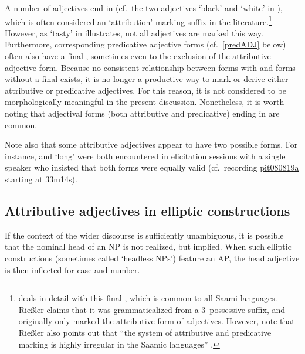A number of adjectives end in  (cf.~the two adjectives  ‘black’ and  ‘white’ in ), which is often considered an ‘attribution’ marking suffix in the literature.\footnote{\citet[215-228]{Riessler2011} deals in detail with this final , which is common to all Saami languages. Rießler claims that it was grammaticalized from a 3\SGs\ possessive suffix, and originally only marked the attributive form of adjectives. However, note that Rießler also points out that “the system of attributive and predicative marking is highly irregular in the Saamic languages” \citep[215]{Riessler2011}.} 
However, as  ‘tasty’ in  illustrates, not all adjectives are marked this way. Furthermore, corresponding predicative adjective forms (cf.~\SEC\ref{predADJ} below) often also have a final , sometimes even to the exclusion of the attributive adjective form. Because no consistent relationship between forms with and forms without a final  exists, it is no longer a productive way to mark or derive either attributive or predicative adjectives. For this reason, it is not considered to be morphologically meaningful in the present discussion. Nonetheless, it is worth noting that adjectival forms (both attributive and predicative) ending in  are common. 

Note also that some attributive adjectives appear to have two possible forms. For instance,  and  ‘long’ were both encountered in elicitation sessions with a single speaker who insisted that both forms were equally valid (cf.~recording \hyperlink{pit080819a}{pit080819a} starting at 33m14s). %

\vfill
\subsection{Attributive adjectives in elliptic constructions}\label{ADJinHeadlessNPs}
If the context of the wider discourse is sufficiently unambiguous, it is possible that the nominal head of an NP is not realized, but implied. %
When such elliptic constructions (sometimes called ‘headless NPs’) feature an AP, the head adjective is then inflected for case and number. 

